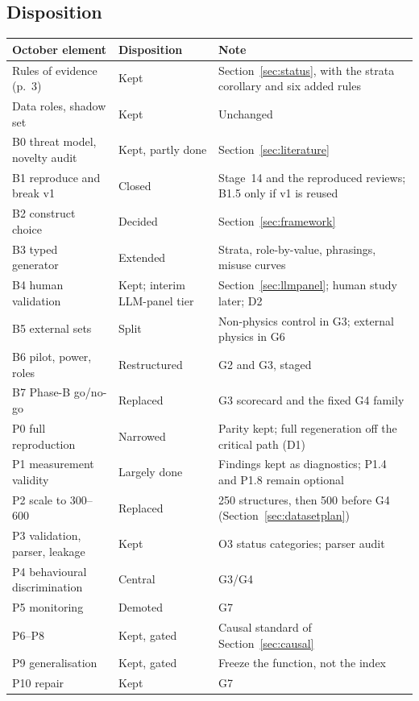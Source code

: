 \documentclass[10pt,a4paper]{article}
\begin{document}
\subsection{Disposition}
\begin{center}\small
\begin{longtable}{@{}P{4.0cm}P{2.4cm}P{9.4cm}@{}}
\toprule
October element & Disposition & Note \\
\midrule\endhead
Rules of evidence (p.~3) & Kept & Section~\ref{sec:status}, with the strata corollary and six added rules \\
Data roles, shadow set & Kept & Unchanged \\
B0 threat model, novelty audit & Kept, partly done & Section~\ref{sec:literature} \\
B1 reproduce and break v1 & Closed & Stage~14 and the reproduced reviews; B1.5 only if v1 is reused \\
B2 construct choice & Decided & Section~\ref{sec:framework} \\
B3 typed generator & Extended & Strata, role-by-value, phrasings, misuse curves \\
B4 human validation & Kept; interim LLM-panel tier & Section~\ref{sec:llmpanel}; human study later; D2 \\
B5 external sets & Split & Non-physics control in G3; external physics in G6 \\
B6 pilot, power, roles & Restructured & G2 and G3, staged \\
B7 Phase-B go/no-go & Replaced & G3 scorecard and the fixed G4 family \\
P0 full reproduction & Narrowed & Parity kept; full regeneration off the critical path (D1) \\
P1 measurement validity & Largely done & Findings kept as diagnostics; P1.4 and P1.8 remain optional \\
P2 scale to 300--600 & Replaced & 250 structures, then 500 before G4 (Section~\ref{sec:datasetplan}) \\
P3 validation, parser, leakage & Kept & O3 status categories; parser audit \\
P4 behavioural discrimination & Central & G3/G4 \\
P5 monitoring & Demoted & G7 \\
P6--P8 & Kept, gated & Causal standard of Section~\ref{sec:causal} \\
P9 generalisation & Kept, gated & Freeze the function, not the index \\
P10 repair & Kept & G7 \\

\end{longtable}
\end{center}
\end{document}
